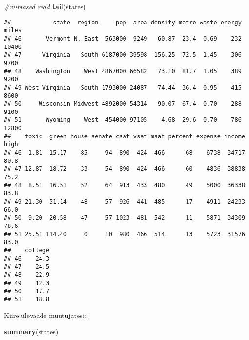 \documentclass[]{article}
\newenvironment{Shaded}{\begin{snugshade}}{\end{snugshade}}
\newcommand{\KeywordTok}[1]{\textcolor[rgb]{0.13,0.29,0.53}{\textbf{#1}}}
\newcommand{\CommentTok}[1]{\textcolor[rgb]{0.56,0.35,0.01}{\textit{#1}}}
\newcommand{\NormalTok}[1]{#1}
\begin{document}
\begin{Shaded}
\begin{Highlighting}[]
\CommentTok{#viimased read}
\KeywordTok{tail}\NormalTok{(states)}
\end{Highlighting}
\end{Shaded}

\begin{verbatim}
##            state  region     pop  area density metro waste energy miles
## 46       Vermont N. East  563000  9249   60.87  23.4  0.69    232 10400
## 47      Virginia   South 6187000 39598  156.25  72.5  1.45    306  9700
## 48    Washington    West 4867000 66582   73.10  81.7  1.05    389  9200
## 49 West Virginia   South 1793000 24087   74.44  36.4  0.95    415  8600
## 50     Wisconsin Midwest 4892000 54314   90.07  67.4  0.70    288  9100
## 51       Wyoming    West  454000 97105    4.68  29.6  0.70    786 12800
##    toxic  green house senate csat vsat msat percent expense income high
## 46  1.81  15.17    85     94  890  424  466      68    6738  34717 80.8
## 47 12.87  18.72    33     54  890  424  466      60    4836  38838 75.2
## 48  8.51  16.51    52     64  913  433  480      49    5000  36338 83.8
## 49 21.30  51.14    48     57  926  441  485      17    4911  24233 66.0
## 50  9.20  20.58    47     57 1023  481  542      11    5871  34309 78.6
## 51 25.51 114.40     0     10  980  466  514      13    5723  31576 83.0
##    college
## 46    24.3
## 47    24.5
## 48    22.9
## 49    12.3
## 50    17.7
## 51    18.8
\end{verbatim}

Kiire ülevaade muutujatest:

\begin{Shaded}
\begin{Highlighting}[]
\KeywordTok{summary}\NormalTok{(states)}
\end{Highlighting}
\end{Shaded}
\end{document}
